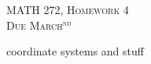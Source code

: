 \documentclass[12pt]{article} %
\begin{document}
\begin{center}
   \textsc{\large MATH 272, Homework 4}\\
   \textsc{Due March$^\textrm{nd}$}
\end{center}
\vspace{.5cm}

coordinate systems and stuff
\end{document}
